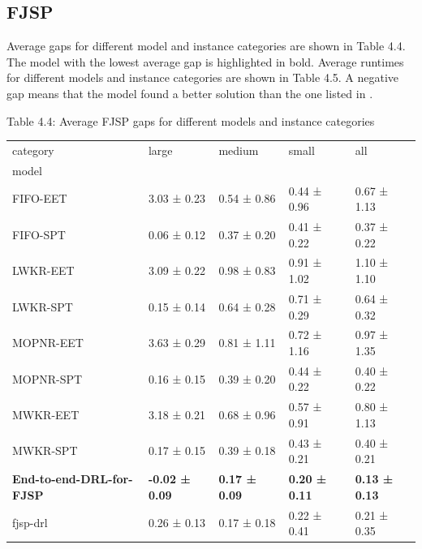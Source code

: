 \subsection{FJSP}

Average gaps for different model and instance categories are shown in Table 4.4. The model with the lowest average gap is highlighted in bold. Average runtimes for different models and instance categories are shown in Table 4.5. A negative gap means that the model found a better solution than the one listed in \cite{fjsp_benchmarks}.

\begin{table}[H]
    Table 4.4: Average FJSP gaps for different models and instance categories\\
    \vspace{1mm}
    \footnotesize 
    \begin{tabular}{lllll}
        \toprule
        category & large & medium & small & all \\
        model &  &  &  &  \\
        \midrule
        FIFO-EET & 3.03 ± 0.23 & 0.54 ± 0.86 & 0.44 ± 0.96 & 0.67 ± 1.13 \\
        FIFO-SPT & 0.06 ± 0.12 & 0.37 ± 0.20 & 0.41 ± 0.22 & 0.37 ± 0.22 \\
        LWKR-EET & 3.09 ± 0.22 & 0.98 ± 0.83 & 0.91 ± 1.02 & 1.10 ± 1.10 \\
        LWKR-SPT & 0.15 ± 0.14 & 0.64 ± 0.28 & 0.71 ± 0.29 & 0.64 ± 0.32 \\
        MOPNR-EET & 3.63 ± 0.29 & 0.81 ± 1.11 & 0.72 ± 1.16 & 0.97 ± 1.35 \\
        MOPNR-SPT & 0.16 ± 0.15 & 0.39 ± 0.20 & 0.44 ± 0.22 & 0.40 ± 0.22 \\
        MWKR-EET & 3.18 ± 0.21 & 0.68 ± 0.96 & 0.57 ± 0.91 & 0.80 ± 1.13 \\
        MWKR-SPT & 0.17 ± 0.15 & 0.39 ± 0.18 & 0.43 ± 0.21 & 0.40 ± 0.21 \\
        \textbf{End-to-end-DRL-for-FJSP} & \textbf{-0.02 ± 0.09} & \textbf{0.17 ± 0.09} & \textbf{0.20 ± 0.11} & \textbf{0.13 ± 0.13} \\
        fjsp-drl & 0.26 ± 0.13 & 0.17 ± 0.18 & 0.22 ± 0.41 & 0.21 ± 0.35 \\
        \bottomrule
    \end{tabular}
\end{table}

